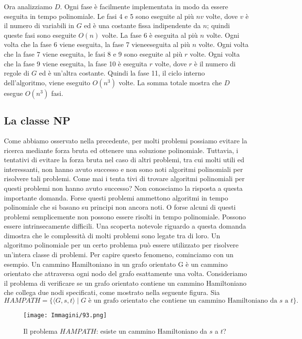 \documentclass{article}
\begin{document}
Ora analizziamo $D$. 
Ogni fase è facilmente implementata in modo da essere eseguita in tempo polinomiale. 
Le fasi 4 e 5 sono eseguite al più $nv$ volte, dove $v$ è il numero di variabili in $G$ ed è una costante fissa indipendente da $n$;
quindi queste fasi sono eseguite $O(n)$ volte. 
La fase 6 è eseguita al più $n$ volte. 
Ogni volta che la fase 6 viene eseguita, la fase 7 vieneeseguita al più $n$ volte.
Ogni volta che la fase 7 viene eseguita, le fasi 8 e 9 sono eseguite al più $r$ volte. 
Ogni volta che la fase 9 viene eseguita, la fase 10 è eseguita $r$ volte, dove $r$ è il numero di regole di $G$ ed è un'altra costante.
Quindi la fase 11, il ciclo interno dell'algoritmo, viene eseguito $O(n^3)$ volte.
La somma totale mostra che $D$ esegue $O(n^3)$ fasi.

\subsection{La classe NP}
Come abbiamo osservato nella precedente, per molti problemi possiamo evitare la ricerca mediante forza bruta ed ottenere una soluzione polinomiale.
Tuttavia, i tentativi di evitare la forza bruta nel caso di altri problemi, tra cui molti utili ed interessanti, non hanno avuto successo e non sono noti algoritmi polinomiali per risolvere tali problemi.
Come mai i tenta tivi di trovare algoritmi polinomiali per questi problemi non hanno avuto successo?
Non conosciamo la risposta a questa importante domanda.
Forse questi problemi ammettono algoritmi in tempo polinomiale che si basano su principi non ancora noti.
O forse alcuni di questi problemi semplicemente non possono essere risolti in tempo polinomiale.
Possono essere intrinsecamente difficili.
Una scoperta notevole riguardo a questa domanda dimostra che le complessità di molti problemi sono legate tra di loro.
Un algoritmo polinomiale per un certo problema può essere utilizzato per risolvere un'intera classe di problemi.
Per capire questo fenomeno, cominciamo con un esempio.
Un cammino Hamiltoniano in un grafo orientato G è un cammino orientato che attraversa ogni nodo del grafo esattamente una volta. 
Consideriamo il problema di verificare se un grafo orientato contiene un cammino Hamiltoniano che collega due nodi specificati, come mostrato nella seguente figura.
Sia
$$
HAMPATH = \{ \langle G, s, t \rangle \mid G \text{ è un grafo orientato che contiene un cammino Hamiltoniano da } s \text{ a } t \}.
$$
\begin{figure}[H]
    \centering
    \texttt{[image: Immagini/93.png]}
    \caption{Il problema $HAMPATH$: esiste un cammino Hamiltoniano da $s$ a $t$?}
    \label{fig:hampath}
\end{figure}
\end{document}
